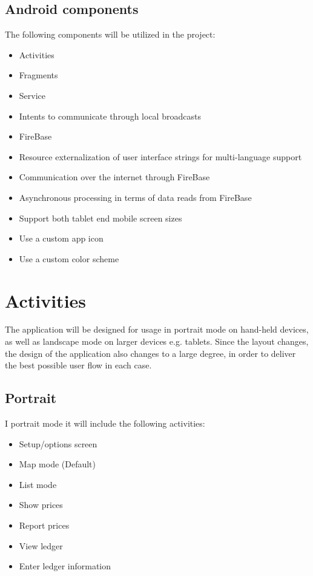 \subsection{Android components}
The following components will be utilized in the project:
\begin{itemize}
	\item Activities
	\item Fragments
	\item Service
	\item Intents to communicate through local broadcasts
	\item FireBase
	\item Resource externalization of user interface strings for multi-language support
	\item Communication over the internet through FireBase
	\item Asynchronous processing in terms of data reads from FireBase
	\item Support both tablet end mobile screen sizes
	\item Use a custom app icon
	\item Use a custom color scheme
\end{itemize}

\section{Activities}
The application will be designed for usage in portrait mode on hand-held devices, as well as landscape mode on larger devices e.g. tablets. Since the layout changes, the design of the application also changes to a large degree, in order to deliver the best possible user flow in each case.

\subsection{Portrait}
I portrait mode it will include the following activities:
\begin{itemize}
	\item Setup/options screen
	\item Map mode (Default)
	\item List mode
	\item Show prices
	\item Report prices
	\item View ledger
	\item Enter ledger information
\end{itemize}

